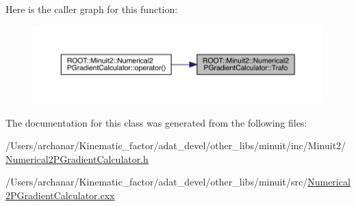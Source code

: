 Here is the caller graph for this function\+:\nopagebreak
\begin{figure}[H]
\begin{center}
\leavevmode
\includegraphics[width=350pt]{d0/d82/classROOT_1_1Minuit2_1_1Numerical2PGradientCalculator_a5a0bce9f2c00da4aae9a2b6d3b706010_icgraph}
\end{center}
\end{figure}


The documentation for this class was generated from the following files\+:\begin{DoxyCompactItemize}
\item 
/\+Users/archanar/\+Kinematic\+\_\+factor/adat\+\_\+devel/other\+\_\+libs/minuit/inc/\+Minuit2/\mbox{\hyperlink{other__libs_2minuit_2inc_2Minuit2_2Numerical2PGradientCalculator_8h}{Numerical2\+P\+Gradient\+Calculator.\+h}}\item 
/\+Users/archanar/\+Kinematic\+\_\+factor/adat\+\_\+devel/other\+\_\+libs/minuit/src/\mbox{\hyperlink{Numerical2PGradientCalculator_8cxx}{Numerical2\+P\+Gradient\+Calculator.\+cxx}}\end{DoxyCompactItemize}
